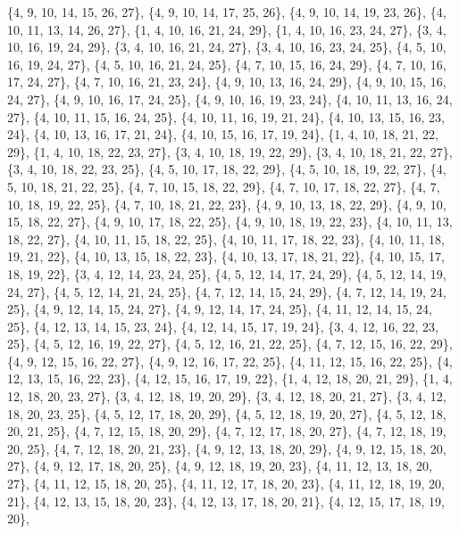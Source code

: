 \documentclass[11pt,a4paper]{article}
\begin{document}
{\{4, 9, 10, 14, 15, 26, 27\}, \{4, 9, 10, 14, 17, 25, 26\}, \{4, 9, 10, 14, 19, 23, 26\}, \{4, 10, 11, 13, 14, 26, 27\}, \{1, 4, 10, 16, 21, 24, 29\},
\{1, 4, 10, 16, 23, 24, 27\}, \{3, 4, 10, 16, 19, 24, 29\}, \{3, 4, 10, 16, 21, 24, 27\}, \{3, 4, 10, 16, 23, 24, 25\}, \{4, 5, 10, 16, 19, 24, 27\},
\{4, 5, 10, 16, 21, 24, 25\}, \{4, 7, 10, 15, 16, 24, 29\}, \{4, 7, 10, 16, 17, 24, 27\}, \{4, 7, 10, 16, 21, 23, 24\}, \{4, 9, 10, 13, 16, 24, 29\},
\{4, 9, 10, 15, 16, 24, 27\}, \{4, 9, 10, 16, 17, 24, 25\}, \{4, 9, 10, 16, 19, 23, 24\}, \{4, 10, 11, 13, 16, 24, 27\}, \{4, 10, 11, 15, 16, 24, 25\},
\{4, 10, 11, 16, 19, 21, 24\}, \{4, 10, 13, 15, 16, 23, 24\}, \{4, 10, 13, 16, 17, 21, 24\}, \{4, 10, 15, 16, 17, 19, 24\}, \{1, 4, 10, 18, 21, 22, 29\},
\{1, 4, 10, 18, 22, 23, 27\}, \{3, 4, 10, 18, 19, 22, 29\}, \{3, 4, 10, 18, 21, 22, 27\}, \{3, 4, 10, 18, 22, 23, 25\}, \{4, 5, 10, 17, 18, 22, 29\},
\{4, 5, 10, 18, 19, 22, 27\}, \{4, 5, 10, 18, 21, 22, 25\}, \{4, 7, 10, 15, 18, 22, 29\}, \{4, 7, 10, 17, 18, 22, 27\}, \{4, 7, 10, 18, 19, 22, 25\},
\{4, 7, 10, 18, 21, 22, 23\}, \{4, 9, 10, 13, 18, 22, 29\}, \{4, 9, 10, 15, 18, 22, 27\}, \{4, 9, 10, 17, 18, 22, 25\}, \{4, 9, 10, 18, 19, 22, 23\},
\{4, 10, 11, 13, 18, 22, 27\}, \{4, 10, 11, 15, 18, 22, 25\}, \{4, 10, 11, 17, 18, 22, 23\}, \{4, 10, 11, 18, 19, 21, 22\}, \{4, 10, 13, 15, 18, 22, 23\},
\{4, 10, 13, 17, 18, 21, 22\}, \{4, 10, 15, 17, 18, 19, 22\}, \{3, 4, 12, 14, 23, 24, 25\}, \{4, 5, 12, 14, 17, 24, 29\}, \{4, 5, 12, 14, 19, 24, 27\},
\{4, 5, 12, 14, 21, 24, 25\}, \{4, 7, 12, 14, 15, 24, 29\}, \{4, 7, 12, 14, 19, 24, 25\}, \{4, 9, 12, 14, 15, 24, 27\}, \{4, 9, 12, 14, 17, 24, 25\},
\{4, 11, 12, 14, 15, 24, 25\}, \{4, 12, 13, 14, 15, 23, 24\}, \{4, 12, 14, 15, 17, 19, 24\}, \{3, 4, 12, 16, 22, 23, 25\}, \{4, 5, 12, 16, 19, 22, 27\},
\{4, 5, 12, 16, 21, 22, 25\}, \{4, 7, 12, 15, 16, 22, 29\}, \{4, 9, 12, 15, 16, 22, 27\}, \{4, 9, 12, 16, 17, 22, 25\}, \{4, 11, 12, 15, 16, 22, 25\},
\{4, 12, 13, 15, 16, 22, 23\}, \{4, 12, 15, 16, 17, 19, 22\}, \{1, 4, 12, 18, 20, 21, 29\}, \{1, 4, 12, 18, 20, 23, 27\}, \{3, 4, 12, 18, 19, 20, 29\},
\{3, 4, 12, 18, 20, 21, 27\}, \{3, 4, 12, 18, 20, 23, 25\}, \{4, 5, 12, 17, 18, 20, 29\}, \{4, 5, 12, 18, 19, 20, 27\}, \{4, 5, 12, 18, 20, 21, 25\},
\{4, 7, 12, 15, 18, 20, 29\}, \{4, 7, 12, 17, 18, 20, 27\}, \{4, 7, 12, 18, 19, 20, 25\}, \{4, 7, 12, 18, 20, 21, 23\}, \{4, 9, 12, 13, 18, 20, 29\},
\{4, 9, 12, 15, 18, 20, 27\}, \{4, 9, 12, 17, 18, 20, 25\}, \{4, 9, 12, 18, 19, 20, 23\}, \{4, 11, 12, 13, 18, 20, 27\}, \{4, 11, 12, 15, 18, 20, 25\},
\{4, 11, 12, 17, 18, 20, 23\}, \{4, 11, 12, 18, 19, 20, 21\}, \{4, 12, 13, 15, 18, 20, 23\}, \{4, 12, 13, 17, 18, 20, 21\}, \{4, 12, 15, 17, 18, 19, 20\},
}
\end{document}
